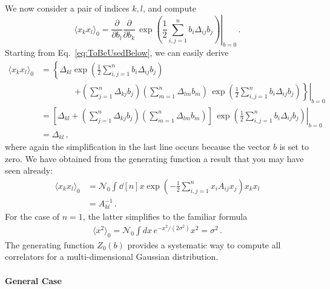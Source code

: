 \documentclass[notes.tex]{subfiles}
\begin{document}
We now consider a pair of indices $k,l$, and compute
\begin{equation}
  \label{eq:GaussTwoPt}
  \langle x_k x_l \rangle_0 =
  \frac{\partial}{\partial b_l} \frac{\partial}{\partial b_k} \,
  \left. \exp\left(
  \frac12 \sum_{i,j=1}^n b_i \Delta_{ij} b_j
  \right) \right|_{b=0} \, .
\end{equation}
Starting from Eq.~\ref{eq:ToBeUsedBelow}, we can easily derive
\begin{align}
  \langle x_k x_l \rangle_0 & =
  \left\{
  \Delta_{kl} \exp\left(
  \frac12 \sum_{i,j=1}^n b_i \Delta_{ij} b_j
  \right)
  \right.
  \\
                            & \quad\quad\quad\quad \left. \left. + \left(
  \sum_{j=1}^n \Delta_{kj} b_j
  \right)
  \left(
  \sum_{m=1}^n \Delta_{lm} b_m
  \right)\,
  \exp\left(
  \frac12 \sum_{i,j=1}^n b_i \Delta_{ij} b_j
  \right)
  \right\} \right|_{b=0}                                                  \\
                            & = \left.\left[ \Delta_{kl} + \left(
    \sum_{j=1}^n \Delta_{kj} b_j
    \right)
    \left(
    \sum_{m=1}^n \Delta_{lm} b_m
    \right)
    \right]\,
  \exp\left(
  \frac12 \sum_{i,j=1}^n b_i \Delta_{ij} b_j
  \right)
  \right|_{b=0}                                                           \\
                            & = \Delta_{kl}\, ,
\end{align}
where again the simplification in the last line occurs because the vector $b$ is set to zero. We have obtained from the generating function a result that you may have seen already:
\begin{align}
  \langle x_k x_l \rangle_0 & =
  \mathcal{N}_0 \int \dd[n]{x} \exp\left(
  -\frac12 \sum_{i,j=1}^n x_i A_{ij} x_j
  \right) x_k x_l                               \\
                            & = A^{-1}_{kl}\, .
\end{align}
For the case of $n=1$, the latter simplifies to the familiar formula
\begin{align}
  \langle x^2 \rangle_0 =
  \mathcal{N}_0 \int dx\, e^{-x^2/(2\sigma^2)} x^2 = \sigma^2\, .
\end{align}
The generating function $Z_0(b)$ provides a systematic way to compute all correlators for a multi-dimensional Gaussian distribution.

\paragraph{General Case}
\end{document}
